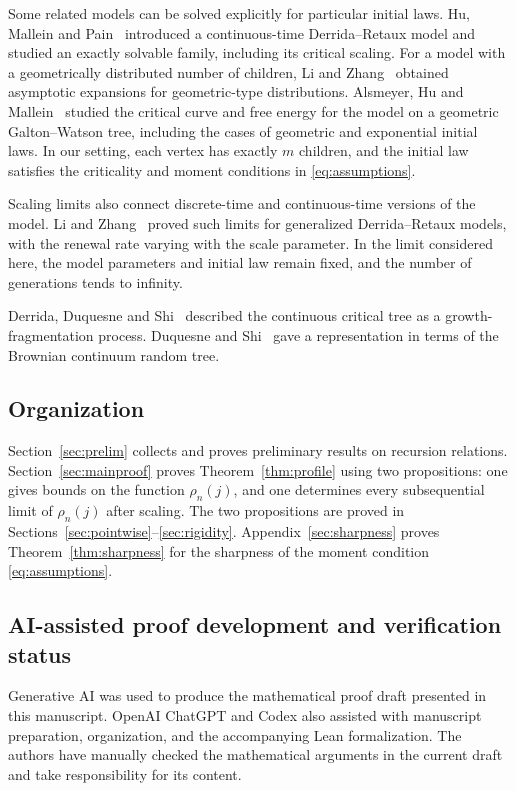 \documentclass[11pt,letterpaper,reqno]{amsart}
\numberwithin{equation}{section}
\theoremstyle{plain}
\theoremstyle{remark}
\begin{document}
Some related models can be solved explicitly for particular initial laws. Hu, Mallein and Pain~\cite{HMP} introduced a continuous-time Derrida--Retaux model and studied an exactly solvable family, including its critical scaling. For a model with a geometrically distributed number of children, Li and Zhang~\cite{LZ} obtained asymptotic expansions for geometric-type distributions. Alsmeyer, Hu and Mallein~\cite{AHM} studied the critical curve and free energy for the model on a geometric Galton--Watson tree, including the cases of geometric and exponential initial laws. In our setting, each vertex has exactly $m$ children, and the initial law satisfies the criticality and moment conditions in \eqref{eq:assumptions}.

Scaling limits also connect discrete-time and continuous-time versions of the model. Li and Zhang~\cite{LZscale} proved such limits for generalized Derrida--Retaux models, with the renewal rate varying with the scale parameter. In the limit considered here, the model parameters and initial law remain fixed, and the number of generations tends to infinity.

Derrida, Duquesne and Shi~\cite{DDS} described the continuous critical tree as a growth-fragmentation process. Duquesne and Shi~\cite{DuS} gave a representation in terms of the Brownian continuum random tree.

\subsection{Organization}
Section~\ref{sec:prelim} collects and proves preliminary results on recursion relations. Section~\ref{sec:mainproof} proves Theorem~\ref{thm:profile} using two propositions: one gives bounds on the function $\rho_n(j)$, and one determines every subsequential limit of $\rho_{n}(j)$ after scaling. The two propositions are proved in Sections~\ref{sec:pointwise}--\ref{sec:rigidity}. Appendix~\ref{sec:sharpness} proves Theorem~\ref{thm:sharpness} for the sharpness of the moment condition \eqref{eq:assumptions}.

\subsection{AI-assisted proof development and verification status}
\label{subsec:ai-declaration}

Generative AI was used to produce the mathematical proof draft presented
in this manuscript. OpenAI ChatGPT and Codex also assisted with manuscript
preparation, organization, and the accompanying Lean formalization.
The authors have manually checked the
mathematical arguments in the current draft and take responsibility for
its content.
\end{document}
